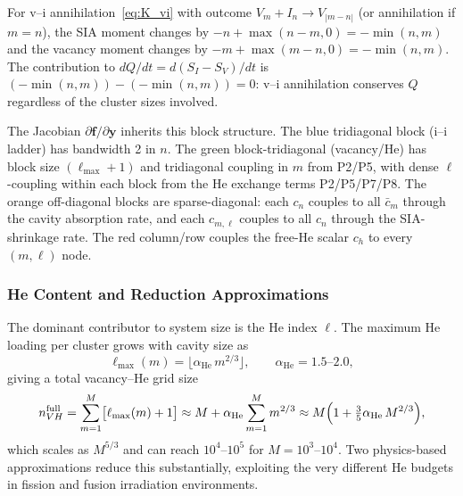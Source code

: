 \documentclass[pdflatex,sn-basic]{sn-jnl} %
\begin{document}
For v--i annihilation~\eqref{eq:K_vi} with outcome $V_m + I_n \to
V_{|m-n|}$ (or annihilation if $m=n$), the SIA moment changes by
$-n + \max(n-m,0) = -\min(n,m)$ and the vacancy moment changes by
$-m + \max(m-n,0) = -\min(n,m)$. The contribution to $dQ/dt =
d(S_I-S_V)/dt$ is $(-\min(n,m)) - (-\min(n,m)) = 0$: v--i annihilation
conserves $Q$ regardless of the cluster sizes involved. \checkmark



\noindent
The Jacobian $\partial\mathbf{f}/\partial\mathbf{y}$ inherits this block
structure. The blue tridiagonal block (i--i ladder) has bandwidth 2 in $n$.
The green block-tridiagonal (vacancy/He) has block size $(\ell_{\max}+1)$
and tridiagonal coupling in $m$ from P2/P5, with dense $\ell$-coupling
within each block from the He exchange terms P2/P5/P7/P8. The orange
off-diagonal blocks are sparse-diagonal: each $c_n$ couples to all
$\bar{c}_m$ through the cavity absorption rate, and each $c_{m,\ell}$
couples to all $c_n$ through the SIA-shrinkage rate. The red column/row
couples the free-He scalar $c_h$ to every $(m,\ell)$ node.

\subsubsection{He Content and Reduction Approximations}
\label{sec:He_approx}

The dominant contributor to system size is the He index $\ell$. The
maximum He loading per cluster grows with cavity size as
\begin{equation}\label{eq:ellmax}
    \ell_{\max}(m) = \lfloor \alpha_{\mathrm{He}}\,m^{2/3} \rfloor,
    \qquad \alpha_{\mathrm{He}} = 1.5\text{--}2.0,
\end{equation}
giving a total vacancy--He grid size
\begin{equation}\label{eq:nVH_full}
    n_{VH}^{\mathrm{full}}
    = \sum_{m=1}^{M}\bigl[\ell_{\max}(m)+1\bigr]
    \approx M + \alpha_{\mathrm{He}}\sum_{m=1}^{M} m^{2/3}
    \approx M\Bigl(1 + \tfrac{3}{5}\alpha_{\mathrm{He}}\,M^{2/3}\Bigr),
\end{equation}
which scales as $M^{5/3}$ and can reach $10^4$--$10^5$ for
$M = 10^3$--$10^4$. Two physics-based approximations reduce this
substantially, exploiting the very different He budgets in fission and
fusion irradiation environments.
\end{document}
